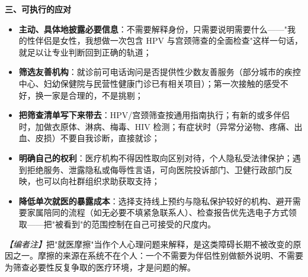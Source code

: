 \textbf{三、可执行的应对}
\begin{itemize}
\item \textbf{主动、具体地披露必要信息}：不需要解释身份，只需要说明需要什么——"我的性伴侣是女性，我想做一次包含 HPV 与宫颈筛查的全面检查"这样一句话，就足以让专业判断回到正确的轨道；
\item \textbf{筛选友善机构}：就诊前可电话询问是否提供性少数友善服务（部分城市的疾控中心、妇幼保健院与民营性健康门诊已有相关项目）；第一次接触的感受不好，换一家是合理的，不是挑剔；
\item \textbf{把筛查清单写下来带去}：HPV/宫颈筛查按通用指南执行；有新的或多伴侣时，加做衣原体、淋病、梅毒、HIV 检测；有症状时（异常分泌物、疼痛、出血、皮损）不要自我诊断，直接就诊；
\item \textbf{明确自己的权利}：医疗机构不得因性取向区别对待，个人隐私受法律保护；遇到拒绝服务、泄露隐私或侮辱性言语，可向医院投诉部门、卫健行政部门反映，也可以向社群组织求助获取支持；
\item \textbf{降低单次就医的暴露成本}：选择支持线上预约与隐私保护较好的机构、避开需要家属陪同的流程（如无必要不填紧急联系人）、检查报告优先选电子方式领取——把"被看到"的范围控制在自己可接受的尺度内。
\end{itemize}

\noindent\textit{【编者注】}把"就医摩擦"当作个人心理问题来解释，是这类障碍长期不被改变的原因之一。摩擦的来源在系统不在个人：一个不需要为伴侣性别做额外说明、不需要为筛查必要性反复争取的医疗环境，才是问题的解。
